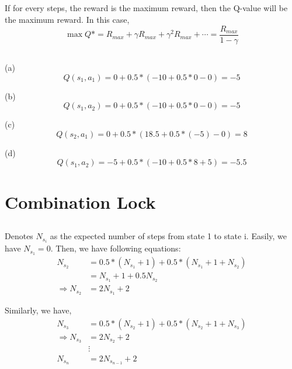 \documentclass[12pt]{article}
\begin{document}
\subsection{}
If for every steps, the reward is the maximum reward, then the Q-value will be the maximum reward. In this case, 
\begin{equation}
    \max Q* = R_{max} + \gamma R_{max} + \gamma^2 R_{max} + \cdots = \frac{R_{max}}{1 - \gamma} \nonumber
\end{equation}

\subsection{}
(a)\begin{equation}
    Q(s_1 , a_1) = 0 + 0.5 * (-10 + 0.5 * 0 - 0) = -5 \nonumber
\end{equation}

(b)\begin{equation}
    Q(s_1 , a_2) = 0 + 0.5 * (-10 + 0.5 * 0 - 0) = -5 \nonumber
\end{equation}

(c)\begin{equation}
    Q(s_2 , a_1) = 0 + 0.5 * (18.5 + 0.5 * (-5) - 0) = 8 \nonumber
\end{equation}

(d)\begin{equation}
    Q(s_1, a_2) = -5 + 0.5 * (-10 + 0.5 * 8 + 5 ) = -5.5  \nonumber
\end{equation}

\newpage

\section{Combination Lock}
\subsection{}
Denotes $N_{s_i}$ as the expected number of steps from state 1 to state i. Easily, we have $ N_{s_1} = 0$. Then, we have following equations:
\begin{align*}
    N_{s_2} &= 0.5*(N_{s_1}+1) + 0.5*(N_{s_1} + 1 + N_{s_2}) \\
            &= N_{s_1} + 1 + 0.5N_{s_2} \\
    \Rightarrow N_{s_2} &= 2 N_{s_1} + 2 
\end{align*}

Similarly, we have,
\begin{align*}
    N_{s_3} &= 0.5*(N_{s_2}+1) + 0.5*(N_{s_2} + 1 + N_{s_3}) \\
    \Rightarrow N_{s_3} &= 2 N_{s_2} + 2 \\
    &\vdots \\
    N_{s_n} &= 2N_{s_{n-1}}+2
\end{align*}
\end{document}
